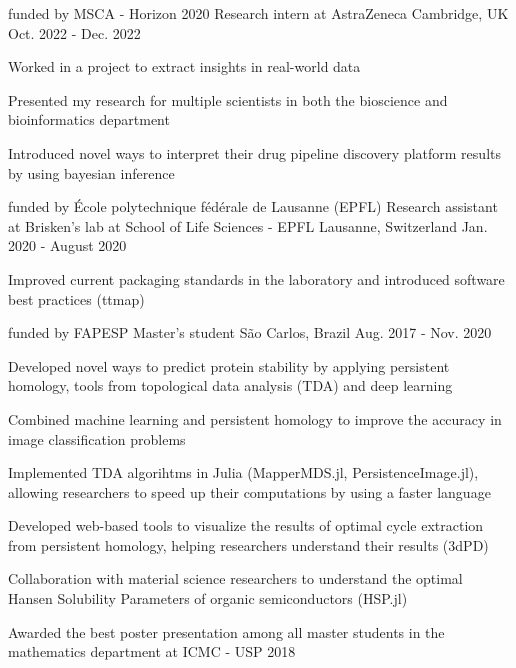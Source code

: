 \begin{cventries}


  \cventry
    {funded by MSCA - Horizon 2020}
    {Research intern at AstraZeneca}
    {Cambridge, UK} 
    {Oct. 2022 - Dec. 2022} 
    {
      \begin{cvitems} 
        \item {Worked in a project to extract insights in real-world data} 
        \item {Presented my research for multiple scientists in both the
               bioscience and bioinformatics department}
        \item {Introduced novel ways to interpret their drug pipeline discovery platform
                results by using bayesian inference}
      \end{cvitems} 
    }


  \cventry
    {funded by École polytechnique fédérale de Lausanne (EPFL)}
    {Research assistant at Brisken's lab at School of Life Sciences - EPFL}
    {Lausanne, Switzerland} 
    {Jan. 2020 - August 2020} 
    {
      \begin{cvitems} 
        \item {Improved current packaging standards in the laboratory and 
                introduced software best practices (ttmap)}
      \end{cvitems} 
    }



  \cventry
    {funded by FAPESP} %
    {Master's student} %
    {São Carlos, Brazil} %
    {Aug. 2017 - Nov. 2020} %
    {
      \begin{cvitems} %
        \item {Developed novel ways to predict protein stability by 
                applying persistent homology, tools from topological
                data analysis (TDA) and deep learning}
        \item {Combined machine learning and persistent homology to improve
               the accuracy in image classification problems}
        \item {Implemented TDA algorihtms in Julia (MapperMDS.jl, PersistenceImage.jl),
               allowing researchers to speed up their computations by using a faster
               language}
        \item {Developed web-based tools to visualize the results of optimal cycle
               extraction from persistent homology, helping researchers understand
               their results (3dPD)}
        \item {Collaboration with material science researchers to understand the
               optimal Hansen Solubility Parameters of organic semiconductors (HSP.jl)}
        \item {Awarded the best poster presentation among all master students in
               the mathematics department at ICMC - USP 2018}
      \end{cvitems}
    }


\end{cventries}
